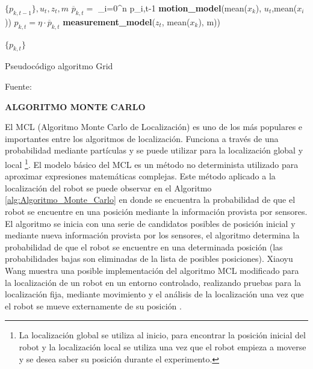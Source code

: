 \begin{algorithm}[H]
\centering
    \begin{algorithmic}[1]
        \Require $\{p_{k,t-1}\}, u_{t}, z_{t}, m$ 
        \vspace{1mm}
        \hline
        \vspace{1mm}
           $\overline{p}_{k,t} = $ \sum_{i=0}^{n} p_{i,t-1} \textbf{motion\_model}(mean($x_{k}$), $u_{t}$,mean($x_{i}$)) 
            \State $p_{k,t} = \eta \cdot \overline{p}_{k,t}$ \textbf{measurement\_model}($z_{t}$, mean($x_{k}$), m))
            
           \EndFor
        \Return $\{p_{k,t}\}$
        \vspace{1mm}
        \hline
        \vspace{1mm}
    \end{algorithmic}
\caption{Pseudocódigo algoritmo Grid}
Fuente: \cite{thrun_probabilistic_2005}
\label{alg:Algoritmo_Grid}
\end{algorithm}


\textbf{ALGORITMO MONTE CARLO}

El MCL (Algoritmo Monte Carlo de Localización) es uno de los más populares e importantes entre los algoritmos de localización. Funciona a través de una probabilidad mediante partículas y se puede utilizar para la localización global y local \footnote{La localización global se utiliza al inicio, para encontrar la posición inicial del robot y la localización local se utiliza una vez que el robot empieza a moverse y se desea saber su posición durante el experimento.}. El modelo básico del MCL es un método no determinista utilizado para aproximar expresiones matemáticas complejas. Este método aplicado a la localización del robot se puede observar en el Algoritmo \ref{alg:Algoritmo_Monte_Carlo} en donde se encuentra la probabilidad de que el robot se encuentre en una posición mediante la información provista por sensores. El algoritmo se inicia con una serie de candidatos posibles de posición inicial y mediante nueva información provista por los sensores, el algoritmo determina la probabilidad de que el robot se encuentre en una determinada posición (las probabilidades bajas son eliminadas de la lista de posibles posiciones). Xiaoyu Wang muestra una posible implementación del algoritmo MCL modificado para la localización de un robot en un entorno controlado, realizando pruebas para la localización fija, mediante movimiento y el análisis de la localización una vez que el robot se mueve externamente de su posición
\cite{xiaoyu_adaptive_2018}.


